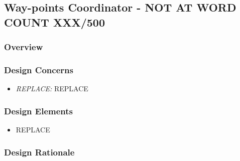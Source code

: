 \subsection{Way-points Coordinator - NOT AT WORD COUNT XXX/500}
\subsubsection{Overview}

\subsubsection{Design Concerns}
\begin{itemize}
\item \textit{REPLACE:} REPLACE

\end{itemize}

\subsubsection{Design Elements}
\begin{itemize}
\item REPLACE
\end{itemize}

\subsubsection{Design Rationale}
